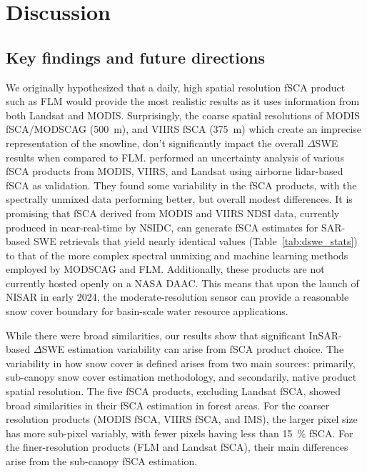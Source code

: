 \hypertarget{ch5-discussion}{\section{Discussion}\label{ch4-discussion}}
\hypertarget{ch5-discussion-1}{\subsection{Key findings and future directions}\label{ch4-discussion}}

We originally hypothesized that a daily, high spatial resolution fSCA product such as FLM would provide the most realistic results as it uses information from both Landsat and MODIS. Surprisingly, the coarse spatial resolutions of MODIS fSCA/MODSCAG (500~m), and VIIRS fSCA (375~m) which create an imprecise representation of the snowline, don't significantly impact the overall $\Delta$SWE results when compared to FLM. \cite{stillingerLandsatMODISVIIRS2023} performed an uncertainty analysis of various fSCA products from MODIS, VIIRS, and Landsat using airborne lidar-based fSCA as validation. They found some variability in the fSCA products, with the spectrally unmixed data performing better, but overall modest differences. It is promising that fSCA derived from MODIS and VIIRS NDSI data, currently produced in near-real-time by NSIDC, can generate fSCA estimates for SAR-based SWE retrievals that yield nearly identical values (Table~\ref{tab:dswe_stats}) to that of the more complex spectral unmixing and machine learning methods employed by MODSCAG and FLM. Additionally, these products are not currently hosted openly on a NASA DAAC. This means that upon the launch of NISAR in early 2024, the moderate-resolution sensor can provide a reasonable snow cover boundary for basin-scale water resource applications. 

While there were broad similarities, our results show that significant InSAR-based $\Delta$SWE estimation variability can arise from fSCA product choice. The variability in how snow cover is defined arises from two main sources: primarily, sub-canopy snow cover estimation methodology, and secondarily, native product spatial resolution. The five fSCA products, excluding Landsat fSCA, showed broad similarities in their fSCA estimation in forest areas. For the coarser resolution products (MODIS fSCA, VIIRS fSCA, and IMS), the larger pixel size has more sub-pixel variably, with fewer pixels having less than 15~\% fSCA. For the finer-resolution products (FLM and Landsat fSCA), their main differences arise from the sub-canopy fSCA estimation. 

